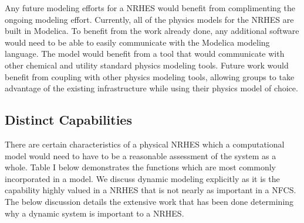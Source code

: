 \documentclass{article}                                                                           %
\begin{document}
\begin{linenumbers}
Any future modeling efforts for a NRHES would benefit from complimenting the ongoing modeling effort. Currently, all of the physics models for the NRHES are built in Modelica. To benefit from the work already done, any additional software would need to be able to easily communicate with the Modelica modeling language.  The model would benefit from a tool that would communicate with other chemical and utility standard physics modeling tools. Future work would benefit from coupling with other physics modeling tools, allowing groups to take advantage of the existing infrastructure while using their physics model of choice.

\subsection{Distinct Capabilities}
There are certain characteristics of a physical NRHES which a computational model would need to have to be a reasonable assessment of the system as a whole. Table I below demonstrates the functions which are most commonly incorporated in a model. We discuss dynamic modeling explicitly as it is the capability highly valued in a NRHES that is not nearly as important in a NFCS. The below discussion details the extensive work that has been done determining why a dynamic system is important to a NRHES.


\end{linenumbers}
\end{document}
